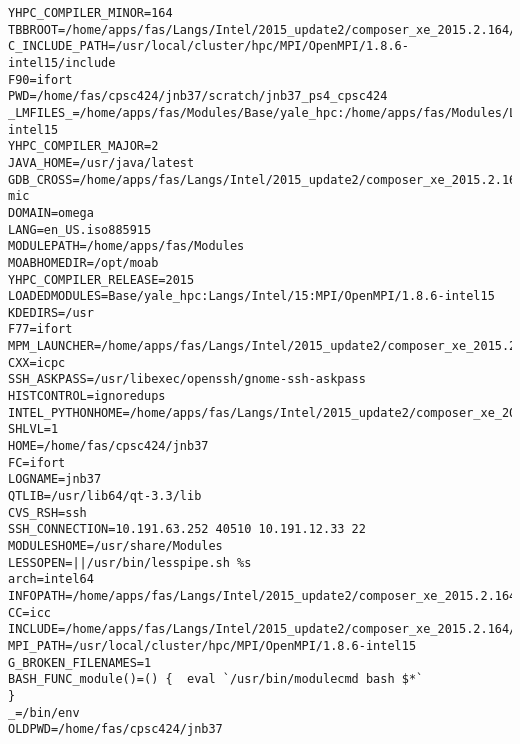 \documentclass[11pt]{article}
\begin{document}
\begin{verbatim}
YHPC_COMPILER_MINOR=164
TBBROOT=/home/apps/fas/Langs/Intel/2015_update2/composer_xe_2015.2.164/tbb
C_INCLUDE_PATH=/usr/local/cluster/hpc/MPI/OpenMPI/1.8.6-intel15/include
F90=ifort
PWD=/home/fas/cpsc424/jnb37/scratch/jnb37_ps4_cpsc424
_LMFILES_=/home/apps/fas/Modules/Base/yale_hpc:/home/apps/fas/Modules/Langs/Intel/15:/home/apps/fas/Modules/MPI/OpenMPI/1.8.6-intel15
YHPC_COMPILER_MAJOR=2
JAVA_HOME=/usr/java/latest
GDB_CROSS=/home/apps/fas/Langs/Intel/2015_update2/composer_xe_2015.2.164/debugger/gdb/intel64_mic/bin/gdb-mic
DOMAIN=omega
LANG=en_US.iso885915
MODULEPATH=/home/apps/fas/Modules
MOABHOMEDIR=/opt/moab
YHPC_COMPILER_RELEASE=2015
LOADEDMODULES=Base/yale_hpc:Langs/Intel/15:MPI/OpenMPI/1.8.6-intel15
KDEDIRS=/usr
F77=ifort
MPM_LAUNCHER=/home/apps/fas/Langs/Intel/2015_update2/composer_xe_2015.2.164/debugger/mpm/bin/start_mpm.sh
CXX=icpc
SSH_ASKPASS=/usr/libexec/openssh/gnome-ssh-askpass
HISTCONTROL=ignoredups
INTEL_PYTHONHOME=/home/apps/fas/Langs/Intel/2015_update2/composer_xe_2015.2.164/debugger/python/intel64/
SHLVL=1
HOME=/home/fas/cpsc424/jnb37
FC=ifort
LOGNAME=jnb37
QTLIB=/usr/lib64/qt-3.3/lib
CVS_RSH=ssh
SSH_CONNECTION=10.191.63.252 40510 10.191.12.33 22
MODULESHOME=/usr/share/Modules
LESSOPEN=||/usr/bin/lesspipe.sh %s
arch=intel64
INFOPATH=/home/apps/fas/Langs/Intel/2015_update2/composer_xe_2015.2.164/debugger/gdb/intel64/share/info/:/home/apps/fas/Langs/Intel/2015_update2/composer_xe_2015.2.164/debugger/gdb/intel64_mic/share/info/
CC=icc
INCLUDE=/home/apps/fas/Langs/Intel/2015_update2/composer_xe_2015.2.164/mkl/include
MPI_PATH=/usr/local/cluster/hpc/MPI/OpenMPI/1.8.6-intel15
G_BROKEN_FILENAMES=1
BASH_FUNC_module()=() {  eval `/usr/bin/modulecmd bash $*`
}
_=/bin/env
OLDPWD=/home/fas/cpsc424/jnb37
\end{verbatim}
\end{document}
